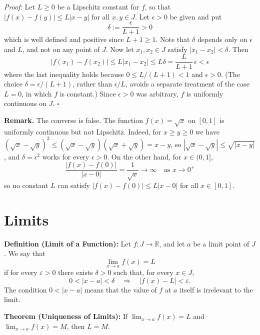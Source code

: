 \documentclass[a4paper,11pt,abstracton]{scrartcl}
\newcommand{\RR}{\mathbb{R}}
\theoremstyle{dotlessP}
\theoremstyle{dotlessS}
\theoremstyle{remark}
\theoremstyle{definition}
\begin{document}
\begin{claim_box}
\textit{Proof:}
Let $L\ge0$ be a Lipschitz constant for $f$, so that $|f(x)-f(y)|\le L|x-y|$ for all $x,y\in J$. Let $\epsilon>0$ be given and put
\[
    \delta:=\frac{\epsilon}{L+1}>0
\]
which is well defined and positive since $L+1\ge1$. Note that $\delta$ depends only on $\epsilon$ and $L$, and not on any point of $J$. Now let $x_1,x_2\in J$ satisfy $|x_1-x_2|<\delta$. Then
\[
    |f(x_1)-f(x_2)|\le L|x_1-x_2|\le L\delta=\frac{L}{L+1}\,\epsilon<\epsilon
\]
where the last inequality holds because $0\le L/(L+1)<1$ and $\epsilon>0$. (The choice $\delta=\epsilon/(L+1)$, rather than $\epsilon/L$, avoids a separate treatment of the case $L=0$, in which $f$ is constant.) Since $\epsilon>0$ was arbitrary, $f$ is uniformly continuous on $J$.
\hfill$\square$
\end{claim_box}

\begin{remark_box}
\textbf{Remark.} The converse is false. The function $f(x)=\sqrt{x}$ on $[0,1]$ is uniformly continuous but not Lipschitz. Indeed, for $x\ge y\ge0$ we have $(\sqrt{x}-\sqrt{y})^2\le(\sqrt{x}-\sqrt{y})(\sqrt{x}+\sqrt{y})=x-y$, so $|\sqrt{x}-\sqrt{y}|\le\sqrt{|x-y|}$, and $\delta=\epsilon^2$ works for every $\epsilon>0$. On the other hand, for $x\in(0,1]$,
\[
    \frac{|f(x)-f(0)|}{|x-0|}=\frac{1}{\sqrt{x}}\longrightarrow\infty\quad\text{as }x\to0^+
\]
so no constant $L$ can satisfy $|f(x)-f(0)|\le L|x-0|$ for all $x\in[0,1]$.
\end{remark_box}

\section{Limits}

\begin{problem_box}
\textbf{Definition (Limit of a Function):}
Let $f:J\to\RR$, and let $a$ be a limit point of $J$. We say that
\[
    \lim_{x\to a}f(x)=L
\]
if for every $\varepsilon>0$ there exists $\delta>0$ such that, for every $x\in J$,
\[
    0<|x-a|<\delta\quad\Longrightarrow\quad |f(x)-L|<\varepsilon.
\]
The condition $0<|x-a|$ means that the value of $f$ at $a$ itself is irrelevant to the limit.
\end{problem_box}

\begin{problem_box}
\textbf{Theorem (Uniqueness of Limits):}
If $\lim_{x\to a}f(x)=L$ and $\lim_{x\to a}f(x)=M$, then $L=M$.
\end{problem_box}
\end{document}
